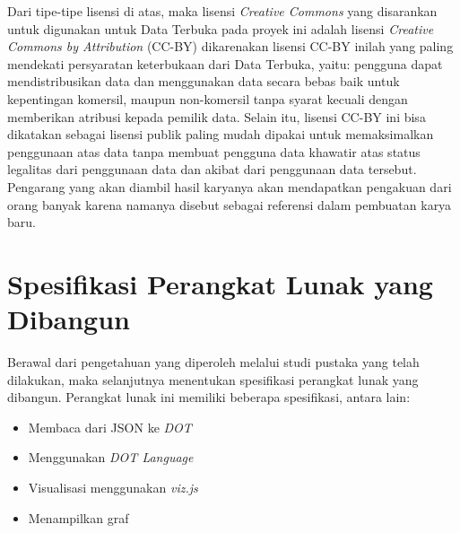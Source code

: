 Dari tipe-tipe lisensi di atas, maka lisensi \textit{Creative Commons} yang disarankan untuk digunakan untuk Data Terbuka pada proyek ini adalah lisensi \textit{Creative Commons by Attribution} (CC-BY) dikarenakan lisensi CC-BY inilah yang paling mendekati persyaratan keterbukaan dari Data Terbuka, yaitu: pengguna dapat mendistribusikan data dan menggunakan data secara bebas baik untuk kepentingan komersil, maupun non-komersil tanpa syarat kecuali dengan memberikan atribusi kepada pemilik data. Selain itu, lisensi CC-BY ini bisa dikatakan sebagai lisensi publik paling mudah dipakai untuk memaksimalkan penggunaan atas data tanpa membuat pengguna data khawatir atas status legalitas dari penggunaan data dan akibat dari penggunaan data tersebut. Pengarang yang akan diambil hasil karyanya akan mendapatkan pengakuan dari orang banyak karena namanya disebut sebagai referensi dalam pembuatan karya baru.


\section{Spesifikasi Perangkat Lunak yang Dibangun}
\label{sec: Spesifikasi Perangkat Lunak yang Dibangun}

Berawal dari pengetahuan yang diperoleh melalui studi pustaka yang telah dilakukan, maka selanjutnya menentukan spesifikasi perangkat lunak yang dibangun. Perangkat lunak ini memiliki beberapa spesifikasi, antara lain:
\begin{itemize}
\item Membaca dari JSON ke \textit{DOT} 
\item Menggunakan \textit{DOT Language}
\item Visualisasi menggunakan \textit{viz.js}
\item Menampilkan graf
\end{itemize}




